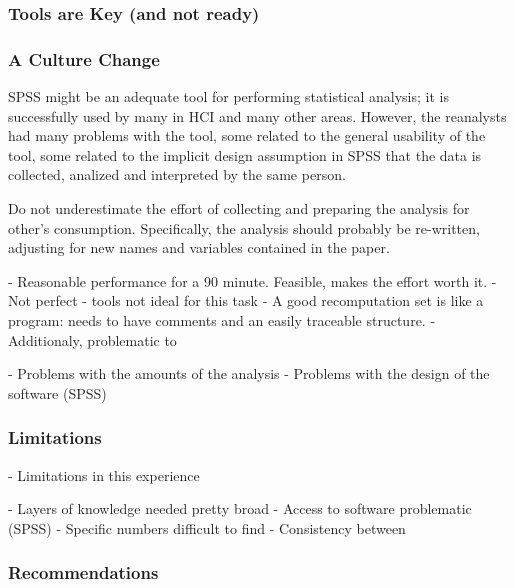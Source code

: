 \subsubsection{Tools are Key (and not ready)}

\subsubsection{A Culture Change}

SPSS might be an adequate tool for performing statistical analysis; it is successfully used by many in HCI and many other areas. However, the reanalysts had many problems with the tool, some related to the general usability of the tool, some related to the implicit design assumption in SPSS that the data is collected, analized and interpreted by the same person.

Do not underestimate the effort of collecting and preparing the analysis for other's consumption. Specifically, the analysis should probably be re-written, adjusting for new names and variables contained in the paper.

- Reasonable performance for a 90 minute. Feasible, makes the effort worth it.
- Not perfect - tools not ideal for this task
- A good recomputation set is like a program: needs to have comments and an easily traceable structure.
- Additionaly, problematic to 

- Problems with the amounts of the analysis
- Problems with the design of the software (SPSS)

\subsubsection{Limitations}

- Limitations in this experience

- Layers of knowledge needed pretty broad
- Access to software problematic (SPSS)
- Specific numbers difficult to find
- Consistency between 


\subsubsection{Recommendations}

